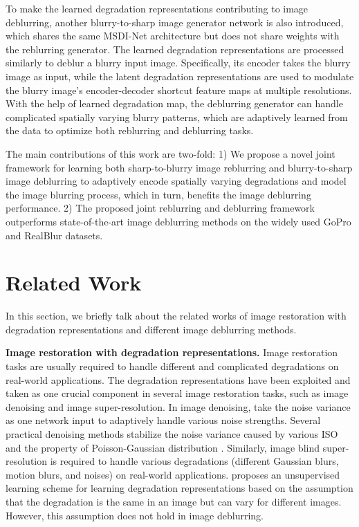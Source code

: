 \documentclass[runningheads]{llncs}
\begin{document}
To make the learned degradation representations contributing to image deblurring, another blurry-to-sharp image generator network is also introduced, which shares the same MSDI-Net architecture but does not share weights with the reblurring generator. The learned degradation representations are processed similarly to deblur a blurry input image. 
Specifically, its encoder takes the blurry image as input, while the latent degradation representations are used to modulate the blurry image's encoder-decoder shortcut feature maps at multiple resolutions. 
With the help of learned degradation map, the deblurring generator can handle complicated spatially varying blurry patterns, which are adaptively learned from the data to optimize both reblurring and deblurring tasks. 

The main contributions of this work are two-fold:
1) We propose a novel joint framework for learning both sharp-to-blurry image reblurring and blurry-to-sharp image deblurring to adaptively encode spatially varying degradations and model the image blurring process, which in turn, benefits the image deblurring performance. 
2) The proposed joint reblurring and deblurring framework outperforms state-of-the-art image deblurring methods on the widely used GoPro \cite{deblur-multi-scale} and RealBlur \cite{realblur} datasets.

\section{Related Work}
In this section, we briefly talk about the related works of image restoration with degradation representations and different image deblurring methods.

\noindent\textbf{Image restoration with degradation representations.}
Image restoration tasks are usually required to handle different and complicated degradations on real-world applications. 
The degradation representations have been exploited and taken as one crucial component in several image restoration tasks, such as image denoising and image super-resolution. In image denoising, \cite{zhang2018ffdnet,MildenhallKPN18,Guo2019Cbdnet} take the noise variance as one network input to adaptively handle various noise strengths. Several practical denoising methods stabilize the noise variance caused by various ISO \cite{PMRID} and the property of Poisson-Gaussian distribution \cite{GAT,Li2022Efficient}.
Similarly, image blind super-resolution is required to handle various degradations (different Gaussian blurs, motion blurs, and noises) on real-world applications. 
\cite{unsupervised_degradation} proposes an unsupervised learning scheme for learning degradation representations based on the assumption that the degradation is the same in an image but can vary for different images. However, this assumption does not hold in image deblurring. 
\end{document}
